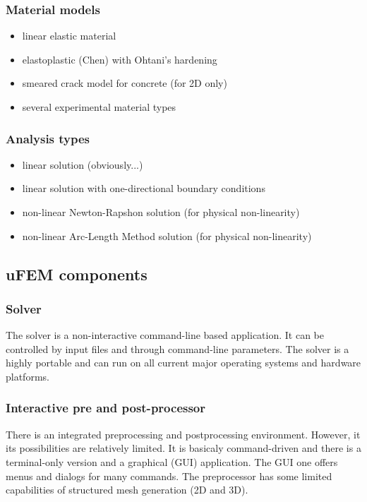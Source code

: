 \documentclass{article}
\begin{document}
\subsubsection{Material models}
\begin{itemize}
\item  linear elastic material
\item  elastoplastic (Chen) with Ohtani's hardening
\item  smeared crack model for concrete (for 2D only)
\item  several experimental material types
\end{itemize}

\subsubsection{Analysis types}
\begin{itemize}
\item  linear solution (obviously...)
\item  linear solution with one-directional boundary conditions
\item  non-linear Newton-Rapshon solution (for physical non-linearity)
\item  non-linear Arc-Length Method solution (for physical non-linearity)
\end{itemize}

\subsection{uFEM components}

\subsubsection{Solver}

 The solver is a non-interactive command-line based application.
 It can be controlled by input files and through command-line
 parameters. The solver is a highly portable and can run on
 all current major operating systems and hardware platforms.



\subsubsection{Interactive pre and post-processor}

 There is an integrated preprocessing and postprocessing 
 environment. However, it its possibilities are relatively limited.
 It is basicaly command-driven and there is a terminal-only
 version and a graphical (GUI) application. The GUI one
 offers menus and dialogs for many commands.
 The preprocessor has some limited capabilities of structured
 mesh generation (2D and 3D).
\end{document}
